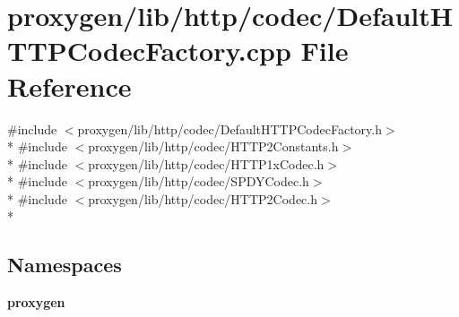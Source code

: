 \section{proxygen/lib/http/codec/\+Default\+H\+T\+T\+P\+Codec\+Factory.cpp File Reference}
\label{DefaultHTTPCodecFactory_8cpp}
{\ttfamily \#include $<$proxygen/lib/http/codec/\+Default\+H\+T\+T\+P\+Codec\+Factory.\+h$>$}\\*
{\ttfamily \#include $<$proxygen/lib/http/codec/\+H\+T\+T\+P2\+Constants.\+h$>$}\\*
{\ttfamily \#include $<$proxygen/lib/http/codec/\+H\+T\+T\+P1x\+Codec.\+h$>$}\\*
{\ttfamily \#include $<$proxygen/lib/http/codec/\+S\+P\+D\+Y\+Codec.\+h$>$}\\*
{\ttfamily \#include $<$proxygen/lib/http/codec/\+H\+T\+T\+P2\+Codec.\+h$>$}\\*
\subsection*{Namespaces}
\begin{DoxyCompactItemize}
\item 
 {\bf proxygen}
\end{DoxyCompactItemize}
